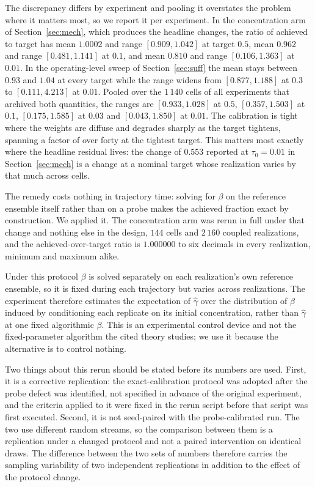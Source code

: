 \documentclass[pdflatex,sn-mathphys-num]{sn-jnl}
\theoremstyle{thmstyleone}
\theoremstyle{thmstyletwo}
\theoremstyle{thmstylethree}
\begin{document}
The discrepancy differs by experiment and pooling it overstates the problem where it matters most, so we report it per experiment. In the concentration arm of Section~\ref{sec:mech}, which produces the headline changes, the ratio of achieved to target has mean $1.0002$ and range $[0.909,1.042]$ at target $0.5$, mean $0.962$ and range $[0.481,1.141]$ at $0.1$, and mean $0.810$ and range $[0.106,1.363]$ at $0.01$. In the operating-level sweep of Section~\ref{sec:suff} the mean stays between $0.93$ and $1.04$ at every target while the range widens from $[0.877,1.188]$ at $0.3$ to $[0.111,4.213]$ at $0.01$. Pooled over the $1\,140$ cells of all experiments that archived both quantities, the ranges are $[0.933,1.028]$ at $0.5$, $[0.357,1.503]$ at $0.1$, $[0.175,1.585]$ at $0.03$ and $[0.043,1.850]$ at $0.01$. The calibration is tight where the weights are diffuse and degrades sharply as the target tightens, spanning a factor of over forty at the tightest target. This matters most exactly where the headline residual lives: the change of $0.553$ reported at $\tau_0=0.01$ in Section~\ref{sec:mech} is a change at a nominal target whose realization varies by that much across cells.

The remedy costs nothing in trajectory time: solving for $\beta$ on the reference ensemble itself rather than on a probe makes the achieved fraction exact by construction. We applied it. The concentration arm was rerun in full under that change and nothing else in the design, $144$ cells and $2\,160$ coupled realizations, and the achieved-over-target ratio is $1.000000$ to six decimals in every realization, minimum and maximum alike.

Under this protocol $\beta$ is solved separately on each realization's own reference ensemble, so it is fixed during each trajectory but varies across realizations. The experiment therefore estimates the expectation of $\hat\gamma$ over the distribution of $\beta$ induced by conditioning each replicate on its initial concentration, rather than $\hat\gamma$ at one fixed algorithmic $\beta$. This is an experimental control device and not the fixed-parameter algorithm the cited theory studies; we use it because the alternative is to control nothing.

Two things about this rerun should be stated before its numbers are used. First, it is a corrective replication: the exact-calibration protocol was adopted after the probe defect was identified, not specified in advance of the original experiment, and the criteria applied to it were fixed in the rerun script before that script was first executed. Second, it is not seed-paired with the probe-calibrated run. The two use different random streams, so the comparison between them is a replication under a changed protocol and not a paired intervention on identical draws. The difference between the two sets of numbers therefore carries the sampling variability of two independent replications in addition to the effect of the protocol change.
\end{document}
